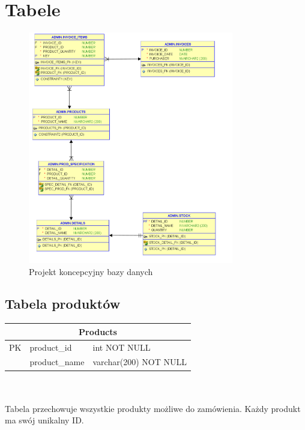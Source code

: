\documentclass{article}
\begin{document}
\section{Tabele}
\begin{figure}[H]
   \centering
   \includegraphics[width=0.8\textwidth,frame]{diagram.png}
   \caption{Projekt koncepcyjny bazy danych}
\end{figure}
\subsection{Tabela produktów}
\begin{tabular}{|c|l|l|} \hline
   \multicolumn{3}{|c|}{Products}             \\ \hline
   PK & product\_id   & int NOT NULL          \\ \hline
      & product\_name & varchar(200) NOT NULL \\ \hline
\end{tabular} \\
\vspace{0.3cm} \\
Tabela przechowuje wszystkie produkty możliwe do zamówienia. Każdy produkt ma
swój unikalny ID.
\end{document}
